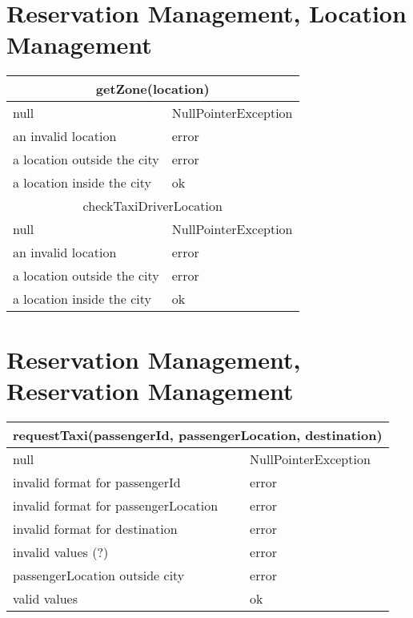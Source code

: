 \documentclass[11pt,oneside,a4paper]{report}
\begin{document}
\section{Reservation Management, Location Management}
\begin{tabular}{p{5cm}|p{6cm}}
\hline
	\multicolumn{2}{c}{getZone(location)}\\\hline
	null &
	NullPointerException \\\hline
	an invalid location &
	error \\\hline
	a location outside the city &
	error \\\hline
	a location inside the city &
	ok \\\hline\hline
		
	\multicolumn{2}{c}{	checkTaxiDriverLocation}\\\hline
	null &
	NullPointerException \\\hline
	an invalid location &
	error \\\hline
	a location outside the city &
	error \\\hline
	a location inside the city &
	ok \\\hline
\end{tabular}


\section{Reservation Management, Reservation Management}
\begin{tabular}{p{5cm}|p{6cm}}
\hline
	\multicolumn{2}{c}{requestTaxi(passengerId, passengerLocation, destination)}\\\hline
	null &
	NullPointerException \\\hline
	invalid format for passengerId &
	error \\\hline
	invalid format for passengerLocation &
	error \\\hline
	invalid format for destination &
	error \\\hline
	invalid values (?) &
	error \\\hline
	passengerLocation outside city &
	error \\\hline
	valid values &
	ok \\\hline\hline
\end{tabular}
\end{document}

